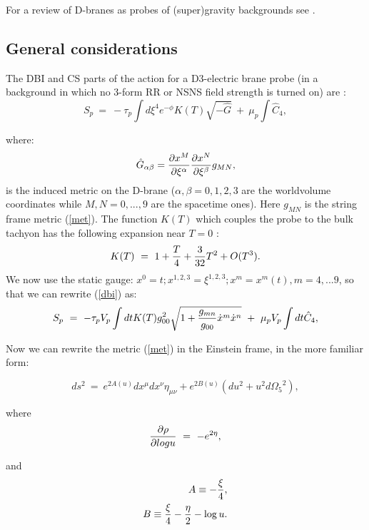 \documentclass[a4paper,12pt]{article}
\begin{document}
For a review of D-branes as probes of (super)gravity backgrounds see \cite{j}.

\subsection{General considerations}
 The DBI and CS parts of the action for a D3-electric brane probe (in a background in which no 3-form RR or NSNS field strength is turned on) are \cite{garousi}:
\begin{equation}
{S_p}~=~-{\tau_p}\int {{d\xi}^4}{e^{-\phi}}K(T)\sqrt{-\hat{G}}~+~{{\mu}_p}\int {\hat C}_4 ,
\label{dbi}
\end{equation}

\noindent where:
\begin{equation}
{\hat G}_{\alpha\beta}= {{\partial x^M}
\over{\partial \xi ^\alpha}}{{\partial x^N}\over{ \partial \xi ^\beta}}g_{MN},
\end{equation}
\noindent is the induced metric on the D-brane ($\alpha, \beta = 0, 1, 2, 3$ are the worldvolume coordinates while $M, N = 0,...,9$ are the spacetime ones). Here $g_{MN}$ is the string frame metric (\ref{met}).
The function $K(T)$ which couples the probe to the bulk tachyon has the following
expansion near $T=0$ \cite{garousi}:
\begin{equation}
K(T)~=~1+ {T\over4} + {3\over{32}}T^2 + O(T^3).
\label{k(t)}
\end{equation}
\noindent We now use the static gauge: $x^0=t; {x^{1,2,3}}={\xi^{1,2,3}}; {x^m}={x^m}(t), m=4,...9$, so that we can rewrite (\ref{dbi}) as:
\begin{equation}
{S_p}~=~-{\tau_p}{V_p}\int dt K(T)g^2_{00} \sqrt{ 1+ {g_{mn}\over{g_{00}}}{\dot x}^m{\dot x}^n }~+~ {{\mu}_p}{V_p} \int dt {\hat C}_4,
\label{probact}
\end{equation}

\noindent Now we can rewrite the metric (\ref{met}) in the Einstein frame, in the more familiar form:

\begin{equation}
ds^2~=~ e^{2A(u)}dx^{\mu}dx^{\nu}\eta_{\mu\nu} + e^{2B(u)}\left( du^2 +u^2d{\Omega_5}^2 \right),
\label{umetr}
\end{equation}

\noindent where 
\begin{equation}
{\partial\rho\over\partial{log u}}~=~- e^{2\eta},
\end{equation} 

\noindent and
\begin{eqnarray}
A \equiv -{\xi\over 4}, \nonumber \\
B \equiv {\xi\over 4} - {\eta\over 2} - \log u.
\end{eqnarray}
\end{document}
